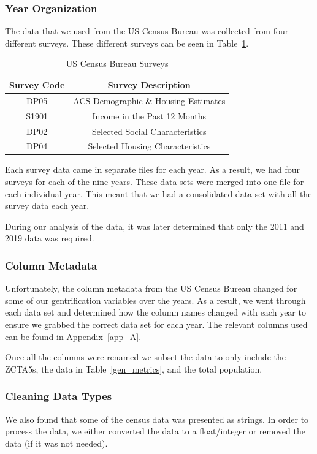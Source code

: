 \documentclass[conference]{IEEEtran}
\begin{document}
\subsubsection{Year Organization}
The data that we used from the US Census Bureau was collected from four different surveys. These different surveys can be seen in Table~\ref{surveys}.
\begin{table}[htbp]
\caption{US Census Bureau Surveys}
\begin{center}
\begin{tabular}{cc}
\hline\hline
\textbf{Survey Code} & \textbf{Survey Description} \\
\hline
DP05 & ACS Demographic \& Housing Estimates\\
S1901 & Income in the Past 12 Months\\
DP02 & Selected Social Characteristics\\
DP04 & Selected Housing Characteristics\\
\hline\hline
\end{tabular}
\label{surveys}
\end{center}
\end{table}
Each survey data came in separate files for each year. As a result, we had four surveys for each of the nine years. These data sets were merged into one file for each individual year. This meant that we had a consolidated data set with all the survey data each year.

During our analysis of the data, it was later determined that only the 2011 and 2019 data was required.

\subsubsection{Column Metadata}
Unfortunately, the column metadata from the US Census Bureau changed for some of our gentrification variables over the years. As a result, we went through each data set and determined how the column names changed with each year to ensure we grabbed the correct data set for each year. The relevant columns used can be found in Appendix~\ref{app_A}.

Once all the columns were renamed we subset the data to only include the ZCTA5s, the data in Table~\ref{gen_metrics}, and the total population.

\subsubsection{Cleaning Data Types}
We also found that some of the census data was presented as strings. In order to process the data, we either converted the data to a float/integer or removed the data (if it was not needed).
\end{document}
